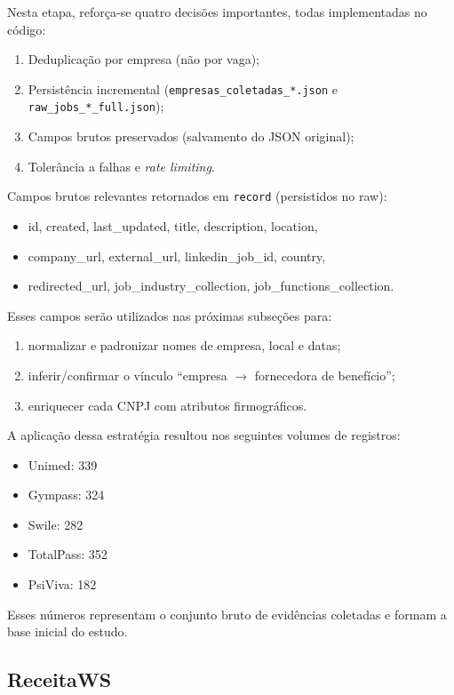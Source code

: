 Nesta etapa, reforça-se quatro decisões importantes, todas implementadas no código:
\begin{enumerate}
    \item Deduplicação por empresa (não por vaga);
    \item Persistência incremental (\texttt{empresas\_coletadas\_*.json} e \texttt{raw\_jobs\_*\_full.json});
    \item Campos brutos preservados (salvamento do JSON original);
    \item Tolerância a falhas e \textit{rate limiting}.
\end{enumerate}

Campos brutos relevantes retornados em \texttt{record} (persistidos no raw):
\begin{itemize}
    \item id, created, last\_updated, title, description, location,
    \item company\_url, external\_url, linkedin\_job\_id, country,
    \item redirected\_url, job\_industry\_collection, job\_functions\_collection.
\end{itemize}

Esses campos serão utilizados nas próximas subseções para:
\begin{enumerate}
    \item normalizar e padronizar nomes de empresa, local e datas;
    \item inferir/confirmar o vínculo ``empresa $\to$ fornecedora de benefício'';
    \item enriquecer cada CNPJ com atributos firmográficos.
\end{enumerate}

A aplicação dessa estratégia resultou nos seguintes volumes de registros:

\begin{itemize}
    \item Unimed: 339
    \item Gympass: 324
    \item Swile: 282
    \item TotalPass: 352
    \item PsiViva: 182
\end{itemize}

Esses números representam o conjunto bruto de evidências coletadas e formam a base inicial do estudo.

\subsection{\textbf{ReceitaWS}}

